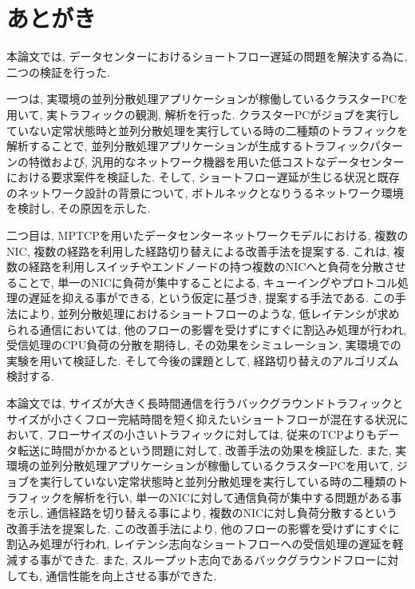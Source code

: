 \documentclass[11pt, a4paper, twocolumn]{jsarticle}
\begin{document}
\section{あとがき}
\label{sec:conclude}
本論文では, データセンターにおけるショートフロー遅延の問題を解決する為に, 二つの検証を行った.

一つは, 実環境の並列分散処理アプリケーションが稼働しているクラスターPCを用いて, 実トラフィックの観測, 解析を行った.
クラスターPCがジョブを実行していない定常状態時と並列分散処理を実行している時の二種類のトラフィックを解析することで,
並列分散処理アプリケーションが生成するトラフィックパターンの特徴および, 汎用的なネットワーク機器を用いた低コストなデータセンターにおける要求案件を検証した.
そして, ショートフロー遅延が生じる状況と既存のネットワーク設計の背景について, ボトルネックとなりうるネットワーク環境を検討し, その原因を示した.

二つ目は, MPTCPを用いたデータセンターネットワークモデルにおける, 複数のNIC, 複数の経路を利用した経路切り替えによる改善手法を提案する.
これは, 複数の経路を利用しスイッチやエンドノードの持つ複数のNICへと負荷を分散させることで, 単一のNICに負荷が集中することによる,
キューイングやプロトコル処理の遅延を抑える事ができる, という仮定に基づき, 提案する手法である.
この手法により, 並列分散処理におけるショートフローのような, 低レイテンシが求められる通信においては, 他のフローの影響を受けずにすぐに割込み処理が行われ, 受信処理のCPU負荷の分散を期待し, その効果をシミュレーション, 実環境での実験を用いて検証した.
そして今後の課題として, 経路切り替えのアルゴリズム検討する.


本論文では, サイズが大きく長時間通信を行うバックグラウンドトラフィックとサイズが小さくフロー完結時間を短く抑えたいショートフローが混在する状況において, フローサイズの小さいトラフィックに対しては,
従来のTCPよりもデータ転送に時間がかかるという問題に対して, 改善手法の効果を検証した.
また, 実環境の並列分散処理アプリケーションが稼働しているクラスターPCを用いて,
ジョブを実行していない定常状態時と並列分散処理を実行している時の二種類のトラフィックを解析を行い, 単一のNICに対して通信負荷が集中する問題がある事を示し,
通信経路を切り替える事により, 複数のNICに対し負荷分散するという改善手法を提案した.
この改善手法により, 他のフローの影響を受けずにすぐに割込み処理が行われ, レイテンシ志向なショートフローへの受信処理の遅延を軽減する事ができた.
また, スループット志向であるバックグラウンドフローに対しても, 通信性能を向上させる事ができた.
\end{document}
